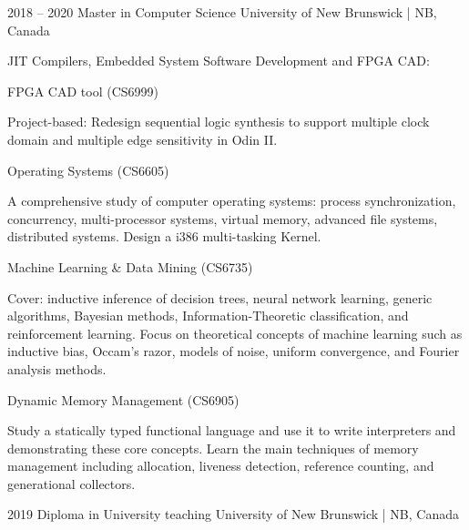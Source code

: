 \documentclass{developercv} %
\begin{document}


\entrys
{2018 -- 2020}
{Master in Computer Science}
{University of New Brunswick | NB, Canada}
{JIT Compilers, Embedded System Software Development and FPGA CAD:
	\begin{tightemize}
		\item FPGA CAD tool (CS6999)
		\begin{smallQuote}
			Project-based: Redesign sequential logic synthesis to support multiple clock domain and multiple edge sensitivity in Odin II.
		\end{smallQuote}

		\item Operating Systems (CS6605)
		\begin{smallQuote}
			A comprehensive study of computer operating systems: process synchronization, concurrency, multi-processor systems, virtual memory, advanced file systems, distributed systems.
			Design a i386 multi-tasking Kernel.
		\end{smallQuote}

		\item Machine Learning \& Data Mining (CS6735)
		\begin{smallQuote}
			Cover: inductive inference of decision trees, neural network learning, generic algorithms, Bayesian methods, Information-Theoretic classification, and reinforcement learning.
			Focus on theoretical concepts of machine learning such as inductive bias, Occam's razor, models of noise, uniform convergence, and Fourier analysis methods.
		\end{smallQuote}

		\item Dynamic Memory Management (CS6905)
		\begin{smallQuote}
			Study a statically typed functional language and use it to write interpreters and demonstrating these core concepts.
			Learn the main techniques of memory management including allocation, liveness detection, reference counting, and generational collectors.
		\end{smallQuote}
	\end{tightemize}
}

\entrys
{2019}
{Diploma in University teaching}
{University of New Brunswick | NB, Canada}
{}
\end{document}
